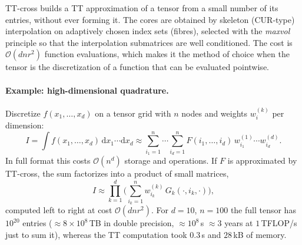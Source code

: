 \documentclass[11pt,a4paper]{article}
\numberwithin{equation}{section}
\theoremstyle{remark}
\newcommand{\dd}{\mathrm{d}}
\begin{document}
TT-cross \cite{TTcross} builds a TT approximation of a tensor from a small number of its entries, without ever forming it.
The cores are obtained by skeleton (CUR-type) interpolation on adaptively chosen index sets (fibres), selected with the \emph{maxvol} principle so that the interpolation submatrices are well conditioned.
The cost is $\mathcal{O}(dnr^2)$ function evaluations, which makes it the method of choice when the tensor is the discretization of a function that can be evaluated pointwise.

\paragraph{Example: high-dimensional quadrature.}
Discretize $f(x_1,\dots,x_d)$ on a tensor grid with $n$ nodes and weights $w^{(k)}_{i}$ per dimension:
\begin{equation}
I=\int f(x_1,\dots,x_d)\,\dd x_1\cdots\dd x_d\approx\sum_{i_1=1}^{n}\cdots\sum_{i_d=1}^{n}F(i_1,\dots,i_d)\,w^{(1)}_{i_1}\cdots w^{(d)}_{i_d}.
\end{equation}
In full format this costs $\mathcal{O}(n^d)$ storage and operations. If $F$ is approximated by TT-cross, the sum factorizes into a product of small matrices,
\begin{equation}
I\approx\prod_{k=1}^{d}\Big(\sum_{i_k=1}^{n}w^{(k)}_{i_k}\,G_k(\cdot,i_k,\cdot)\Big),
\end{equation}
computed left to right at cost $\mathcal{O}(dnr^2)$.
For $d=10$, $n=100$ the full tensor has $10^{20}$ entries ($\approx8\times10^{8}$\,TB in double precision, $\approx10^{8}$\,s $\approx3$ years at $1$\,TFLOP/s just to sum it), whereas the TT computation took $0.3$\,s and $28$\,kB of memory.
\end{document}
